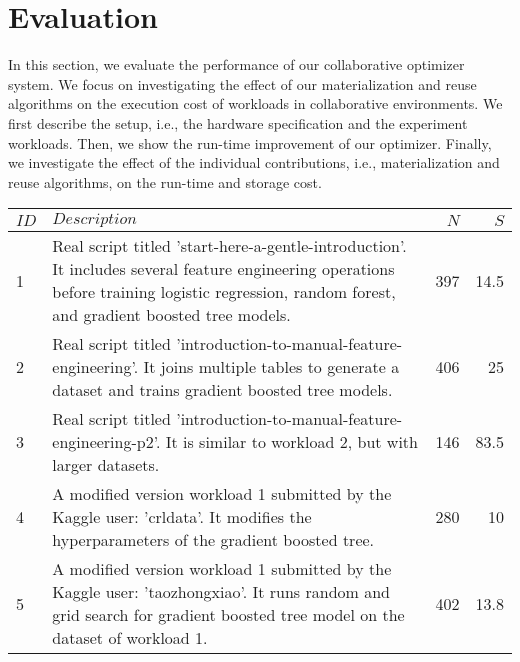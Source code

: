 \section{Evaluation} \label{sec-evaluation} 
In this section, we evaluate the performance of our collaborative optimizer system.
We focus on investigating the effect of our materialization and reuse algorithms on the execution cost of workloads in collaborative environments.
We first describe the setup, i.e., the hardware specification and the experiment workloads.
Then, we show the run-time improvement of our optimizer.
Finally, we investigate the effect of the individual contributions, i.e., materialization and reuse algorithms, on the run-time and storage cost.
\begin{table*}[t]
\begin{tabular}{lp{}rr}
\hline
\textbf{$ID$} & \textbf{$Description$}& \textbf{$N$}& \textbf{$S$}   \\
\hline
1 &  \parbox[t]{0.84\textwidth}{\linespread{0.5}\selectfont \small Real script titled 'start-here-a-gentle-introduction'. It includes several feature engineering operations before training logistic regression, random forest, and gradient boosted tree models.} & 397 & 14.5\\[0.4cm]

2 &   \parbox[t]{0.84\textwidth}{\linespread{0.5}\selectfont \small Real script titled 'introduction-to-manual-feature-engineering'. It joins multiple tables to generate a dataset and trains gradient boosted tree models.} & 406 & 25\\[0.4cm]

3 &   \parbox[t]{0.84\textwidth}{\linespread{0.5}\selectfont \small Real script titled 'introduction-to-manual-feature-engineering-p2'. It is similar to workload 2, but with larger datasets.} & 146 & 83.5\\[0.15cm]

4 & \parbox[t]{0.84\textwidth}{\linespread{0.5}\selectfont \small A modified version workload 1 submitted by the Kaggle user: 'crldata'. It modifies the hyperparameters of the gradient boosted tree.} & 280 & 10\\[0.4cm]

5 & \parbox[t]{0.84\textwidth}{\linespread{0.5}\selectfont \small A modified version workload 1 submitted by the Kaggle user: 'taozhongxiao'. It runs random and grid search for gradient boosted tree model on the dataset of workload 1.} & 402 & 13.8\\[0.4cm]


\end{tabular}
\end{table*}
